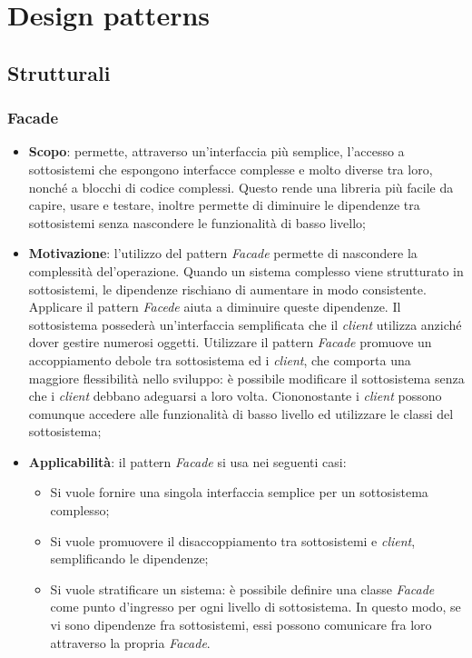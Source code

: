 \newpage
\section{Design patterns}
\subsection{Strutturali}
\subsubsection{Facade}
\begin{itemize}
\item \textbf{Scopo}: permette, attraverso un'interfaccia più semplice, l'accesso a sottosistemi che espongono interfacce complesse e molto diverse tra loro, nonché a blocchi di codice complessi. Questo rende una libreria più facile da capire, usare e testare, inoltre permette di diminuire le dipendenze tra sottosistemi senza nascondere le funzionalità di basso livello;

\item \textbf{Motivazione}: l'utilizzo del pattern \textit{Facade} permette di nascondere la complessità del'operazione. Quando un sistema complesso viene strutturato in sottosistemi, le dipendenze rischiano di aumentare in modo consistente. Applicare il pattern \textit{Facede} aiuta a diminuire queste dipendenze. Il sottosistema possederà un'interfaccia semplificata che il \textit{client} utilizza anziché dover gestire numerosi oggetti. Utilizzare il pattern \textit{Facade} promuove un accoppiamento debole tra sottosistema ed i \textit{client}, che comporta una maggiore flessibilità nello sviluppo: è possibile modificare il sottosistema senza che i \textit{client} debbano adeguarsi a loro volta. Ciononostante i \textit{client} possono comunque accedere alle funzionalità di basso livello ed utilizzare le classi del sottosistema;

\item \textbf{Applicabilità}: il pattern \textit{Facade} si usa nei seguenti casi:
	\begin{itemize}
		\item Si vuole fornire una singola interfaccia semplice per un sottosistema complesso;
		\item Si vuole promuovere il disaccoppiamento tra sottosistemi e \textit{client}, semplificando le dipendenze;
		\item Si vuole stratificare un sistema: è possibile definire una classe \textit{Facade} come punto d'ingresso per ogni livello di sottosistema. In questo modo, se vi sono dipendenze fra sottosistemi, essi possono comunicare fra loro attraverso la propria \textit{Facade}.
	\end{itemize}
	

\end{itemize}
